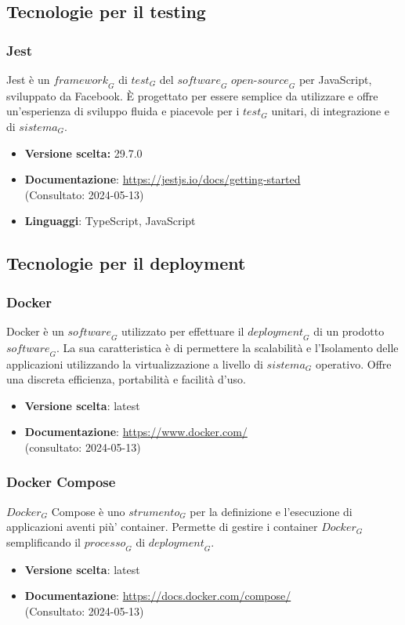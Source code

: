 \newpage
\subsection{Tecnologie per il testing}
\subsubsection{Jest}
Jest è un $\textit{framework}_G$ di $\textit{test}_G$ del $\textit{software}_G$ $\textit{open-source}_G$ per JavaScript, sviluppato da Facebook. È progettato per essere semplice da utilizzare e offre un'esperienza di sviluppo fluida e piacevole per i $\textit{test}_G$ unitari, di integrazione e di $\textit{sistema}_G$.
\begin{itemize}
\item \textbf{Versione scelta:} 29.7.0
\item \textbf{Documentazione}: \url{https://jestjs.io/docs/getting-started}\\
(Consultato: 2024-05-13)
\item \textbf{Linguaggi}: TypeScript, JavaScript
\end{itemize}
\subsection{Tecnologie per il deployment}
\subsubsection{Docker}
Docker è un $\textit{software}_G$ utilizzato per effettuare il $\textit{deployment}_G$ di un prodotto $\textit{software}_G$. La sua caratteristica è di permettere la scalabilità e l'Isolamento delle applicazioni utilizzando la virtualizzazione a livello di $\textit{sistema}_G$ operativo. Offre una discreta efficienza, portabilità e facilità d'uso.
\begin{itemize}
    \item \textbf{Versione scelta}: latest
    \item \textbf{Documentazione}: \url{https://www.docker.com/}\\
    (consultato: 2024-05-13)
\end{itemize}
\subsubsection{Docker Compose}
$\textit{Docker}_G$ Compose è uno $\textit{strumento}_G$ per la definizione e l'esecuzione di applicazioni aventi più' container. Permette di gestire i container $\textit{Docker}_G$ semplificando il $\textit{processo}_G$ di $\textit{deployment}_G$.
\begin{itemize}
    \item \textbf{Versione scelta}: latest
    \item \textbf{Documentazione}: \url{https://docs.docker.com/compose/}\\
    (Consultato: 2024-05-13)
\end{itemize}